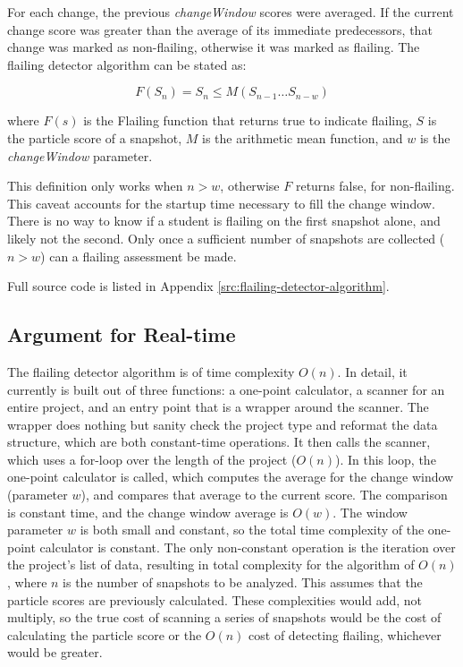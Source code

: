For each change, the previous \emph{changeWindow} scores were averaged. If the current change score was greater than the average of its immediate predecessors, that change was marked as non-flailing, otherwise it was marked as flailing. The flailing detector algorithm can be stated as: 

\[F(S_n) = S_n \leq M(S_{n-1} \dots S_{n-w})\]

where $F(s)$ is the Flailing function that returns true to indicate flailing, $S$ is the particle score of a snapshot, $M$ is the arithmetic mean function, and $w$ is the \emph{changeWindow} parameter. 

This definition only works when $n > w$, otherwise $F$ returns false, for non-flailing. This caveat accounts for the startup time necessary to fill the change window. There is no way to know if a student is flailing on the first snapshot alone, and likely not the second. Only once a sufficient number of snapshots are collected ($n>w$) can a flailing assessment be made.

Full source code is listed in Appendix \ref{src:flailing-detector-algorithm}.

\subsection{Argument for Real-time}
The flailing detector algorithm is of time complexity $O(n)$. In detail, it currently is built out of three functions: a one-point calculator, a scanner for an entire project, and an entry point that is a wrapper around the scanner. The wrapper does nothing but sanity check the project type and reformat the data structure, which are both constant-time operations. It then calls the scanner, which uses a for-loop over the length of the project ($O(n)$). In this loop, the one-point calculator is called, which computes the average for the change window (parameter $w$), and compares that average to the current score. The comparison is constant time, and the change window average is $O(w)$. The window parameter $w$ is both small and constant, so the total time complexity of the one-point calculator is constant. The only non-constant operation is the iteration over the project's list of data, resulting in total complexity for the algorithm of $O(n)$, where $n$ is the number of snapshots to be analyzed. This assumes that the particle scores are previously calculated. These complexities would add, not multiply, so the true cost of scanning a series of snapshots would be the cost of calculating the particle score or the $O(n)$ cost of detecting flailing, whichever would be greater.

